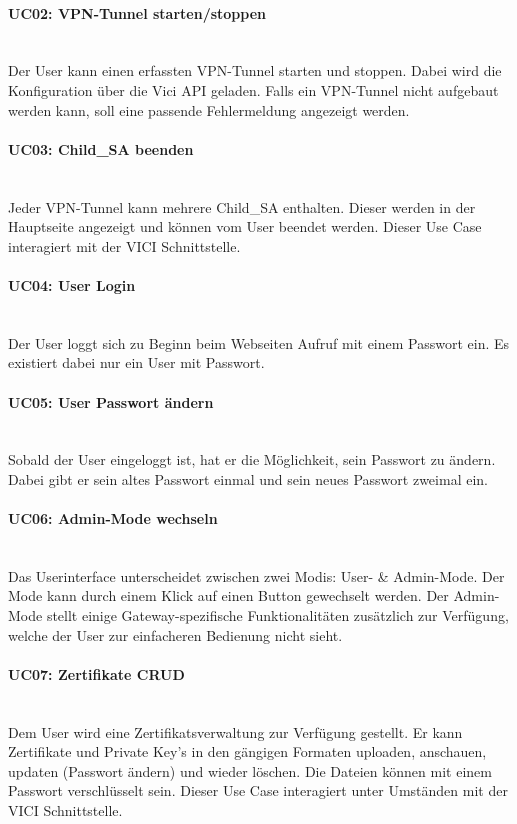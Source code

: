 \paragraph{UC02: VPN-Tunnel starten/stoppen}\mbox{} \\
Der User kann einen erfassten VPN-Tunnel starten und stoppen. Dabei wird die Konfiguration über die Vici API geladen. Falls ein VPN-Tunnel nicht aufgebaut werden kann, soll eine passende Fehlermeldung angezeigt werden. 

\paragraph{UC03: Child\_SA beenden}\mbox{} \\
Jeder VPN-Tunnel kann mehrere Child\_SA enthalten. Dieser werden in der Hauptseite angezeigt und können vom User beendet werden. Dieser Use Case interagiert mit der VICI Schnittstelle.

\paragraph{UC04: User Login}\mbox{} \\
Der User loggt sich zu Beginn beim Webseiten Aufruf mit einem Passwort ein. Es existiert dabei nur ein User mit Passwort.

\paragraph{UC05: User Passwort ändern}\mbox{} \\
Sobald der User eingeloggt ist, hat er die Möglichkeit, sein Passwort zu ändern. Dabei gibt er sein altes Passwort einmal und sein neues Passwort zweimal ein.

\paragraph{UC06: Admin-Mode wechseln}\mbox{} \\
Das Userinterface unterscheidet zwischen zwei Modis: User- \& Admin-Mode. Der Mode kann durch einem Klick auf einen Button gewechselt werden. Der Admin-Mode stellt einige Gateway-spezifische Funktionalitäten zusätzlich zur Verfügung, welche der User zur einfacheren Bedienung nicht sieht.

\paragraph{UC07: Zertifikate CRUD}\mbox{} \\
Dem User wird eine Zertifikatsverwaltung zur Verfügung gestellt. Er kann Zertifikate und Private Key's in den gängigen Formaten uploaden, anschauen, updaten (Passwort ändern) und wieder löschen. Die Dateien können mit einem Passwort verschlüsselt sein. Dieser Use Case interagiert unter Umständen mit der VICI Schnittstelle.


